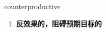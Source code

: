 
\begin{frame}
{\huge counterproductive}
\begin{center}
\begin{enumerate}\Large
  \item \textbf{反效果的，阻碍预期目标的}
\end{enumerate}
\end{center}
\end{frame}
